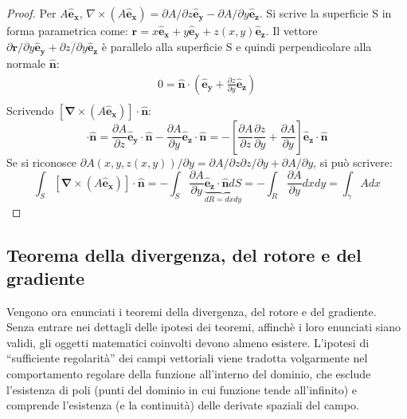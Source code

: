 \begin{proof}
 Per $A\bm{\hat{e}_x}$, ${\nabla} \times (A \bm{\hat{e}_x}) = 
{\partial A}/{\partial z} \bm{\hat{e}_y} - {\partial A}/{\partial y} \mathbf{\hat{e}_z}$.
Si scrive la superficie S in forma parametrica come: $\bm{r} = x\bm{\hat{e}_x} +
y\bm{\hat{e}_y} + z(x,y)\bm{\hat{e}_z}$. Il vettore ${\partial \bm{r}}/{\partial y} \bm{\hat{e}_y} + 
{\partial z}/{\partial y} \bm{\hat{e}_z} $ è parallelo alla 
superficie S e quindi perpendicolare alla normale $\bm{\hat{n}}$: 
\begin{equation}
\begin{aligned}
0 = \bm{\hat{n}} \cdot \displaystyle \left(\bm{\hat{e}_y} + 
\frac{\partial z}{\partial y} \bm{\hat{e}_z} \right) \\
\end{aligned}
\end{equation}
%
Scrivendo  $[\bm{\nabla} \times (A \bm{\hat{e}_x})] \cdot \bm{\hat{n}}$:
\begin{equation}
 [\bm{\nabla} \times (A \bm{\hat{e}_x})] \cdot \bm{\hat{n}} = 
  \frac{\partial A}{\partial z} \bm{\hat{e}_y} \cdot \bm{\hat{n}}
   - \frac{\partial A}{\partial y} \bm{\hat{e}_z}\cdot \bm{\hat{n}} =
  - \displaystyle\left[ \frac{\partial A}{\partial z} \frac{\partial z}{\partial y} +
  \frac{\partial A}{\partial y}  \right] \bm{\hat{e}_z}\cdot \bm{\hat{n}}
\end{equation}
%
Se si riconosce ${\partial A(x,y,z(x,y))}/{\partial y} = {\partial A}/{\partial z} {\partial z}/{\partial y} +
  {\partial A}/{\partial y}$, si può scrivere:
\begin{equation}
 \int_S [\bm{\nabla} \times (A \bm{\hat{e}_x})] \cdot \bm{\hat{n}} =
 - \int_S \frac{\partial A}{\partial y} \underbrace{\bm{\hat{e}_z}\cdot \bm{\hat{n}} dS}_{dR = dx dy} = 
 - \int_R \frac{\partial A}{\partial y} dx dy = \int_\gamma A dx
\end{equation}
%
\end{proof}


\subsection{Teorema della divergenza, del rotore e del gradiente}
Vengono ora enunciati i teoremi della divergenza, del rotore e del gradiente. Senza entrare nei dettagli delle ipotesi dei teoremi, affinchè i loro enunciati siano validi, gli oggetti matematici coinvolti devono almeno esistere. L'ipotesi di ``sufficiente regolarità'' dei campi vettoriali viene tradotta volgarmente nel comportamento regolare della funzione all'interno del dominio, che esclude l'esistenza di poli (punti del dominio in cui funzione tende all'infinito) e comprende l'esistenza (e la continuità) delle derivate spaziali del campo.
%

